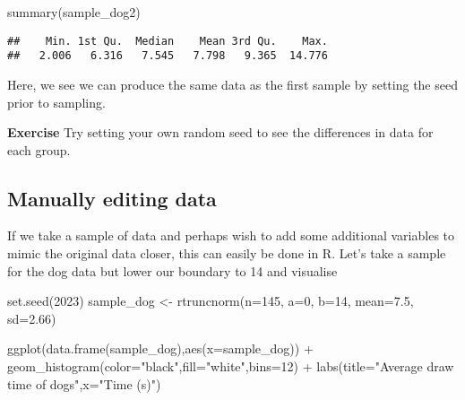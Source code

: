 \documentclass[
]{book}
\newenvironment{Shaded}{\begin{snugshade}}{\end{snugshade}}
\newcommand{\AttributeTok}[1]{\textcolor[rgb]{0.77,0.63,0.00}{#1}}
\newcommand{\DecValTok}[1]{\textcolor[rgb]{0.00,0.00,0.81}{#1}}
\newcommand{\FloatTok}[1]{\textcolor[rgb]{0.00,0.00,0.81}{#1}}
\newcommand{\FunctionTok}[1]{\textcolor[rgb]{0.00,0.00,0.00}{#1}}
\newcommand{\NormalTok}[1]{#1}
\newcommand{\OtherTok}[1]{\textcolor[rgb]{0.56,0.35,0.01}{#1}}
\newcommand{\SpecialCharTok}[1]{\textcolor[rgb]{0.00,0.00,0.00}{#1}}
\newcommand{\StringTok}[1]{\textcolor[rgb]{0.31,0.60,0.02}{#1}}
\begin{document}
\begin{Shaded}
\begin{Highlighting}[]
\FunctionTok{summary}\NormalTok{(sample\_dog2)}
\end{Highlighting}
\end{Shaded}

\begin{verbatim}
##    Min. 1st Qu.  Median    Mean 3rd Qu.    Max. 
##   2.006   6.316   7.545   7.798   9.365  14.776
\end{verbatim}

Here, we see we can produce the same data as the first sample by setting the seed prior to sampling.

\textbf{Exercise}
Try setting your own random seed to see the differences in data for each group.

\hypertarget{manually-editing-data}{%
\subsection{Manually editing data}\label{manually-editing-data}}

If we take a sample of data and perhaps wish to add some additional variables to mimic the original data closer, this can easily be done in R. Let's take a sample for the dog data but lower our boundary to 14 and visualise

\begin{Shaded}
\begin{Highlighting}[]
\FunctionTok{set.seed}\NormalTok{(}\DecValTok{2023}\NormalTok{)}
\NormalTok{sample\_dog }\OtherTok{\textless{}{-}} \FunctionTok{rtruncnorm}\NormalTok{(}\AttributeTok{n=}\DecValTok{145}\NormalTok{, }\AttributeTok{a=}\DecValTok{0}\NormalTok{, }\AttributeTok{b=}\DecValTok{14}\NormalTok{, }\AttributeTok{mean=}\FloatTok{7.5}\NormalTok{, }\AttributeTok{sd=}\FloatTok{2.66}\NormalTok{)}

\FunctionTok{ggplot}\NormalTok{(}\FunctionTok{data.frame}\NormalTok{(sample\_dog),}\FunctionTok{aes}\NormalTok{(}\AttributeTok{x=}\NormalTok{sample\_dog)) }\SpecialCharTok{+} \FunctionTok{geom\_histogram}\NormalTok{(}\AttributeTok{color=}\StringTok{"black"}\NormalTok{,}\AttributeTok{fill=}\StringTok{"white"}\NormalTok{,}\AttributeTok{bins=}\DecValTok{12}\NormalTok{) }\SpecialCharTok{+} 
            \FunctionTok{labs}\NormalTok{(}\AttributeTok{title=}\StringTok{"Average draw time of dogs"}\NormalTok{,}\AttributeTok{x=}\StringTok{"Time (s)"}\NormalTok{)}
\end{Highlighting}
\end{Shaded}
\end{document}
